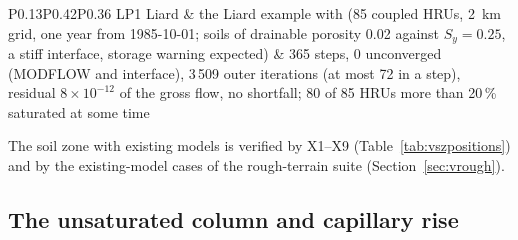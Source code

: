 \begin{longtable}{P{0.13\linewidth}P{0.42\linewidth}P{0.36\linewidth}}
LP1 Liard & the Liard example with  (85 coupled HRUs, 2~km grid, one year from 1985-10-01; soils of drainable porosity 0.02 against $S_y=0.25$, a stiff interface, storage warning expected) & 365 steps, 0 unconverged (MODFLOW and interface), 3\,509 outer iterations (at most 72 in a step), residual $8\times10^{-12}$ of the gross flow, no shortfall; 80 of 85 HRUs more than 20\,\% saturated at some time\\\bottomrule
\end{longtable}
\noindent The soil zone with existing models is verified by X1--X9 (Table~\ref{tab:vszpositions}) and by the
existing-model cases of the rough-terrain suite (Section~\ref{sec:vrough}).

\subsection{The unsaturated column and capillary rise}\label{sec:vszcolumn}
